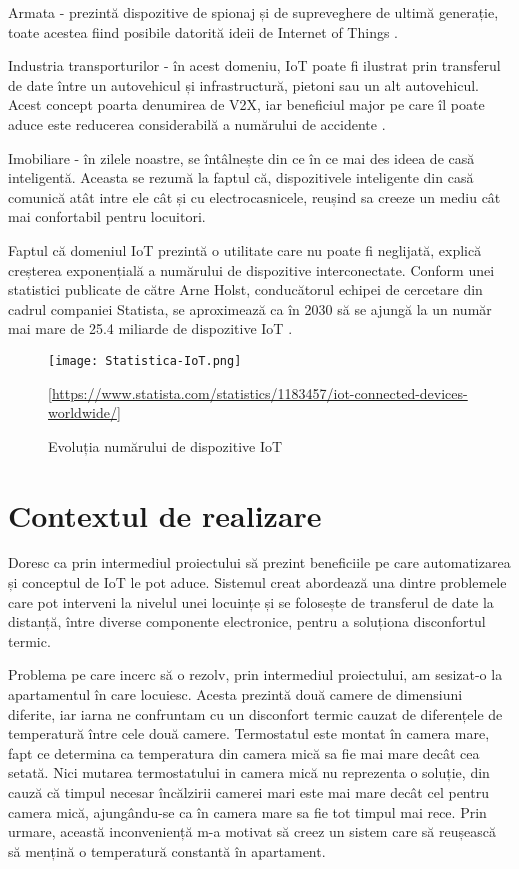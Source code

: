 	Armata - prezintă dispozitive de spionaj și de supreveghere de ultimă generație, toate acestea fiind posibile datorită ideii de Internet of Things \cite{army}.

	Industria transporturilor - în acest domeniu, IoT poate fi ilustrat prin transferul de date între un autovehicul și infrastructură, pietoni sau un alt autovehicul. Acest concept poarta denumirea de V2X, iar beneficiul major pe care îl poate aduce este reducerea considerabilă a numărului de accidente \cite{V2X}.   

	Imobiliare - în zilele noastre, se întâlnește din ce în ce mai des ideea de casă inteligentă. Aceasta se rezumă la faptul că, dispozitivele inteligente din casă comunică atât intre ele cât și cu electrocasnicele, reușind sa creeze un mediu cât mai confortabil pentru locuitori.

	Faptul că domeniul IoT prezintă o utilitate care nu poate fi neglijată, explică creșterea exponențială a numărului de dispozitive interconectate. Conform unei statistici publicate de către Arne Holst, conducătorul echipei de cercetare din cadrul companiei Statista, se aproximează ca în 2030 să se ajungă la un număr mai mare de 25.4 miliarde de dispozitive IoT \cite{increaseOfIot}.

\bigskip

\begin{figure}[H]
   	\centering
    	\texttt{[image: Statistica-IoT.png]}
	\caption{Evoluția numărului de dispozitive IoT}
	[\url{https://www.statista.com/statistics/1183457/iot-connected-devices-worldwide/}]
\end{figure}

\section{Contextul de realizare}\label{sec:context}
	Doresc ca prin intermediul proiectului să prezint beneficiile pe care automatizarea și conceptul de IoT le pot aduce. Sistemul creat abordează una dintre problemele care pot interveni la nivelul unei locuințe și se folosește de transferul de date la distanță, între diverse componente electronice, pentru a soluționa disconfortul termic.

	Problema pe care incerc să o rezolv, prin intermediul proiectului, am sesizat-o la apartamentul în care locuiesc. Acesta prezintă două camere de dimensiuni diferite, iar iarna ne confruntam cu un disconfort termic cauzat de diferențele de temperatură între cele două camere. Termostatul este montat în camera mare, fapt ce determina ca temperatura din camera mică sa fie mai mare decât cea setată. Nici mutarea termostatului in camera mică nu reprezenta o soluție, din cauză că timpul necesar încălzirii camerei mari este mai mare decât cel pentru camera mică, ajungându-se ca în camera mare sa fie tot timpul mai rece. Prin urmare, această inconveniență m-a motivat să creez un sistem care să reușească să mențină o temperatură constantă în apartament.

